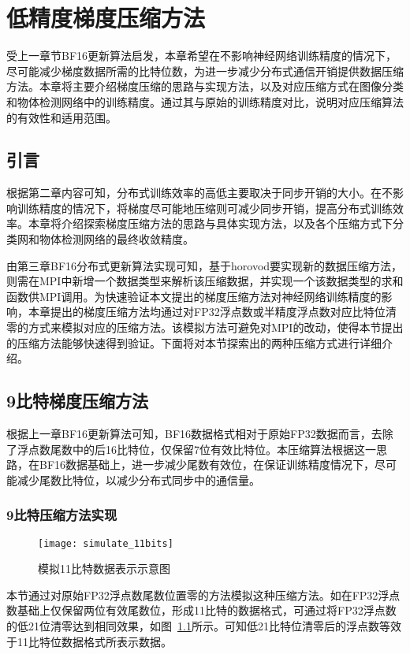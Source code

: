 \chapter{低精度梯度压缩方法}
受上一章节BF16更新算法启发，本章希望在不影响神经网络训练精度的情况下，尽可能减少梯度数据所需的比特位数，为进一步减少分布式通信开销提供数据压缩方法。本章将主要介绍梯度压缩的思路与实现方法，以及对应压缩方式在图像分类和物体检测网络中的训练精度。通过其与原始的训练精度对比，说明对应压缩算法的有效性和适用范围。
\section{引言}
根据第二章内容可知，分布式训练效率的高低主要取决于同步开销的大小。在不影响训练精度的情况下，将梯度尽可能地压缩则可减少同步开销，提高分布式训练效率。本章将介绍探索梯度压缩方法的思路与具体实现方法，以及各个压缩方式下分类网和物体检测网络的最终收敛精度。

由第三章BF16分布式更新算法实现可知，基于horovod要实现新的数据压缩方法，则需在MPI中新增一个数据类型来解析该压缩数据，并实现一个该数据类型的求和函数供MPI调用。为快速验证本文提出的梯度压缩方法对神经网络训练精度的影响，本章提出的梯度压缩方法均通过对FP32浮点数或半精度浮点数对应比特位清零的方式来模拟对应的压缩方法。该模拟方法可避免对MPI的改动，使得本节提出的压缩方法能够快速得到验证。下面将对本节探索出的两种压缩方式进行详细介绍。
\section{9比特梯度压缩方法}
根据上一章BF16更新算法可知，BF16数据格式相对于原始FP32数据而言，去除了浮点数尾数中的后16比特位，仅保留7位有效比特位。本压缩算法根据这一思路，在BF16数据基础上，进一步减少尾数有效位，在保证训练精度情况下，尽可能减少尾数比特位，以减少分布式同步中的通信量。

\subsection{9比特压缩方法实现}
\begin{figure}[htp]
\centering
\texttt{[image: simulate\_11bits]}
\caption{模拟11比特数据表示示意图}
\label{fig:simulate_11bits}
\end{figure}
本节通过对原始FP32浮点数尾数位置零的方法模拟这种压缩方法。如在FP32浮点数基础上仅保留两位有效尾数位，形成11比特的数据格式，可通过将FP32浮点数的低21位清零达到相同效果，如图~\ref{fig:simulate_11bits}所示。可知低21比特位清零后的浮点数等效于11比特位数据格式所表示数据。

